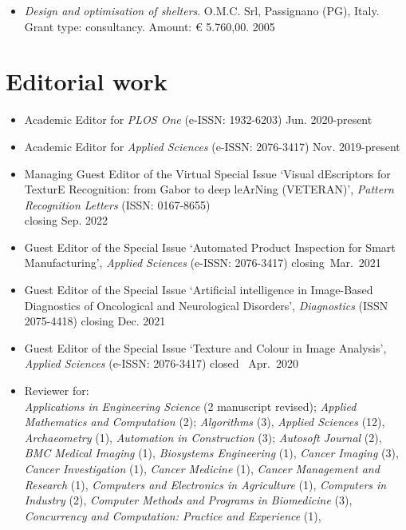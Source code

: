 \documentclass[11pt]{article}
\begin{document}
\begin{itemize}
	\item \emph{Design and optimisation of shelters}. O.M.C. Srl, Passignano (PG), Italy. Grant type: consultancy. Amount: € 5.760,00. \hfill 2005
\end{itemize}

\section*{Editorial work}

\begin{itemize}
	\item Academic Editor for \emph{PLOS One} (e-ISSN: 1932-6203) \hfill Jun. 2020-present
	\item Academic Editor for \emph{Applied Sciences} (e-ISSN: 2076-3417) \hfill Nov. 2019-present
		\item Managing Guest Editor of the Virtual Special Issue `Visual dEscriptors for TexturE Recognition: from Gabor to deep leArNing (VETERAN)', \emph{Pattern Recognition Letters} (ISSN: 0167-8655) \\ \mbox{} \hfill closing Sep. 2022
	\item Guest Editor of the Special Issue `Automated Product Inspection for Smart Manufacturing', \emph{Applied Sciences} (e-ISSN: 2076-3417) \hfill closing~Mar.~2021
	\item Guest Editor of the Special Issue `Artificial intelligence in Image-Based Diagnostics of Oncological and Neurological Disorders', \emph{Diagnostics} (ISSN 2075-4418) \hfill closing Dec. 2021
	\item Guest Editor of the Special Issue `Texture and Colour in Image Analysis', \emph{Applied Sciences} (e-ISSN: 2076-3417) \hfill closed~ Apr.~2020
	\item Reviewer for: \\
		\emph{Applications in Engineering Science} (2 manuscript revised);
    \emph{Applied Mathematics and Computation} (2);
    \emph{Algorithms} (3),
    \emph{Applied Sciences} (12),
    \emph{Archaeometry} (1),
    \emph{Automation in Construction} (3);
    \emph{Autosoft Journal} (2),
    \emph{BMC Medical Imaging} (1),
    \emph{Biosystems Engineering} (1),
    \emph{Cancer Imaging} (3),
    \emph{Cancer Investigation} (1),
    \emph{Cancer Medicine} (1),
    \emph{Cancer Management and Research} (1),
    \emph{Computers and Electronics in Agriculture} (1),
    \emph{Computers in Industry} (2),
    \emph{Computer Methods and Programs in Biomedicine} (3),
    \emph{Concurrency and Computation: Practice and Experience} (1), 

\end{itemize}
\end{document}
